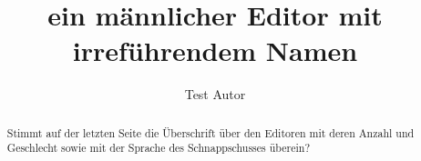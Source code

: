 \documentclass{snapshotmfo}
\author{Test Autor}
\title{ein männlicher Editor mit irreführendem Namen}
\begin{document}
\begin{abstract}
Stimmt auf der letzten Seite die Überschrift über den Editoren mit deren Anzahl und Geschlecht sowie mit 
der Sprache des Schnappschusses überein?
\end{abstract}
\end{document}
